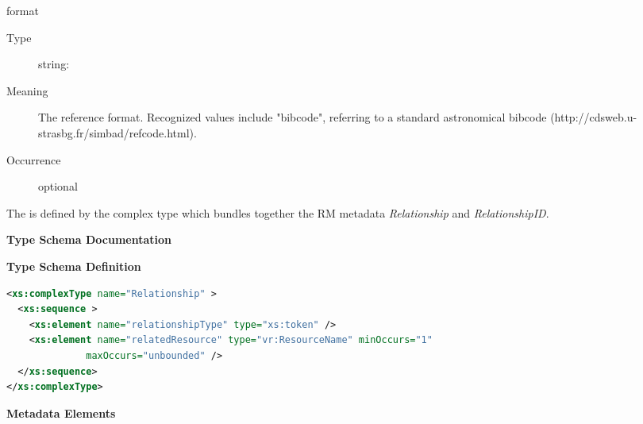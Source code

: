 \documentclass[11pt,a4paper]{ivoa}
\begin{document}
\begingroup\small\begin{bigdescription}
\item[format]
\begin{description}
\item[Type] string: 
\item[Meaning] 
                 The reference format.  Recognized values include {"}bibcode{"}, 
                 referring to a standard astronomical bibcode 
                 (http://cdsweb.u-strasbg.fr/simbad/refcode.html).  
               
\item[Occurrence] optional
\end{description}


\end{bigdescription}\endgroup

\endgroup


The  is defined by the
 complex type which bundles together the
RM metadata \emph{Relationship} and
\emph{RelationshipID}.  


\begingroup
      	\renewcommand*\descriptionlabel[1]{%
      	\hbox to 5.5em{\emph{#1}\hfil}}\vspace{2ex}\noindent\textbf{ Type Schema Documentation}


\vspace{1ex}\noindent\textbf{ Type Schema Definition}

\begin{lstlisting}[language=XML,basicstyle=\footnotesize]
<xs:complexType name="Relationship" >
  <xs:sequence >
    <xs:element name="relationshipType" type="xs:token" />
    <xs:element name="relatedResource" type="vr:ResourceName" minOccurs="1"
              maxOccurs="unbounded" />
  </xs:sequence>
</xs:complexType>
\end{lstlisting}

\vspace{0.5ex}\noindent\textbf{ Metadata Elements}
\end{document}
